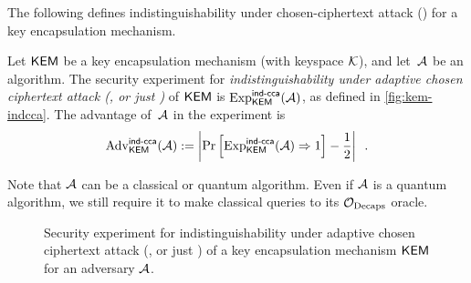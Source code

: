 


The following defines indistinguishability under chosen-ciphertext attack (\INDCCA) for a key encapsulation mechanism.

\begin{definition}
  Let $\textsf{\upshape\mdseries KEM}$ be a key encapsulation mechanism (with keyspace $\mathcal{K}$), and let~$\mathcal{A}$ be an algorithm.
  The security experiment for \emph{indistinguishability under adaptive chosen ciphertext attack (\INDCCATwo, or just \INDCCA)} of $\textsf{\upshape\mdseries KEM}$ is $\mathrm{Exp}^{\textsf{\upshape\mdseries \textsf{\upshape\mdseries ind-cca}}}_{\textsf{\upshape\mdseries KEM}}(\mathcal{A})$, as defined in \autoref{fig:kem-indcca}.
  The advantage of~$\mathcal{A}$ in the experiment is
\[ \mathrm{Adv}^{\textsf{\upshape\mdseries \textsf{\upshape\mdseries ind-cca}}}_{\textsf{\upshape\mdseries KEM}}(\mathcal{A}) := \left| \Pr\left[ \mathrm{Exp}^{\textsf{\upshape\mdseries \textsf{\upshape\mdseries ind-cca}}}_{\textsf{\upshape\mdseries KEM}}(\mathcal{A}) \Rightarrow 1 \right] - \frac{1}{2} \right| \enspace . \]
\end{definition}

Note that $\mathcal{A}$ can be a classical or quantum algorithm.
Even if $\mathcal{A}$ is a quantum algorithm, we still require it to make classical queries to its $\mathcal{O}_{\mathrm{Decaps}}$ oracle.

\begin{figure}[h]
\centering
{}
\caption{Security experiment for indistinguishability under adaptive
  chosen ciphertext attack (\INDCCATwo, or just \INDCCA) of a key
  encapsulation mechanism $\textsf{\upshape\mdseries KEM}$ for an adversary $\mathcal{A}$.}
\label{fig:kem-indcca}
\end{figure}

